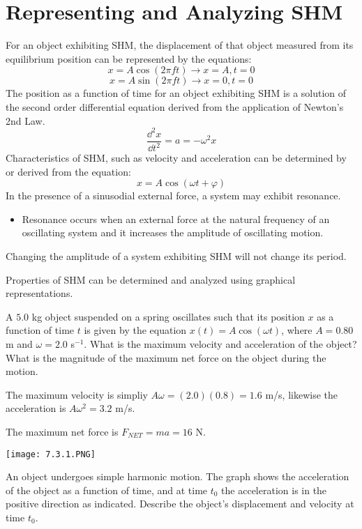 \documentclass[../mech.tex]{subfiles}
\begin{document}
\section{Representing and Analyzing SHM}
For an object exhibiting SHM, the displacement of that object measured from its equilibrium position can be represented by the equations:
\[ x = A\cos (2\pi ft) \rightarrow x=A, t=0\]
\[ x=A\sin(2\pi ft)\rightarrow x=0, t=0\]
The position as a function of time for an object exhibiting SHM is a solution of the second order differential equation derived from the application of Newton's 2nd Law.
\[ \frac{\dd^2 x}{\dd t^2}=a=-\omega^2 x\]
Characteristics of SHM, such as velocity and acceleration can be determined by or derived from the equation:
\[ x=A\cos (\omega t + \varphi) \]
In the presence of a sinusodial external force, a system may exhibit resonance.
\begin{itemize}
    \item Resonance occurs when an external force at the natural frequency of an oscillating system and it increases the amplitude of oscillating motion.
\end{itemize}
Changing the amplitude of a system exhibiting SHM will not change its period.

Properties of SHM can be determined and analyzed using graphical representations.

\begin{example}
    A $5.0$ kg object suspended on a spring oscillates such that its position $x$ as a function of time $t$ is given by the equation $x(t)=A\cos (\omega t)$, where $A=0.80$ m and $\omega = 2.0$ s$^{-1}$. What is the 
    maximum velocity and acceleration of the object? What is the magnitude of the maximum net force on the object during the motion.

    The maximum velocity is simpliy $A\omega = (2.0)(0.8)=1.6$ m/s, likewise the acceleration is $A\omega^2 = 3.2$ m/s.

    The maximum net force is $F_{NET}=ma = 16$ N.
\end{example}

\ex \begin{center}
    \texttt{[image: 7.3.1.PNG]}
\end{center}
An object undergoes simple harmonic motion. The graph shows the acceleration of the object as a function of time, and at time $t_0$ the acceleration is in the positive direction as indicated. Describe the object's displacement and velocity at time $t_0$.
\end{document}
